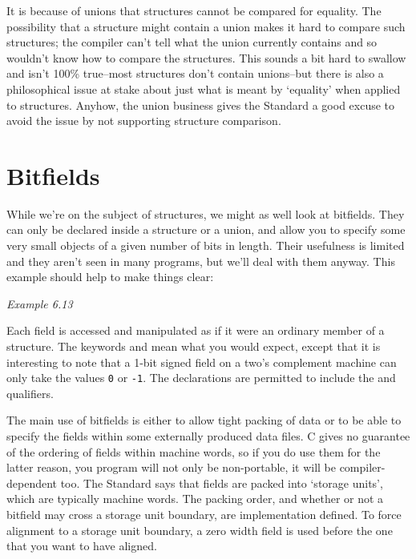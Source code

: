  It is because of unions that structures cannot be compared for equality.
   The possibility that a structure might contain a union makes it hard to
   compare such structures; the compiler can't tell what the union currently
   contains and so wouldn't know how to compare the structures. This sounds
   a bit hard to swallow and isn't 100\% true--most structures don't contain
   unions--but there is also a philosophical issue at stake about just what
   is meant by `equality' when applied to structures. Anyhow, the union
   business gives the Standard a good excuse to avoid the issue by not
   supporting structure comparison.


 
        \section{Bitfields}\label{sec:bitfields}
        

  

  While we're on the subject of structures, we might as well look at
   bitfields. They can only be declared inside a structure or a union, and
   allow you to specify some very small objects of a given number of bits in
   length.  Their usefulness is limited and they aren't seen in many programs,
   but we'll deal with them anyway. This example should help to make things
   clear:


   \begin{center}\textit{Example 6.13}\end{center}


  Each field is accessed and manipulated as if it were an ordinary member of
   a structure. The keywords \signed{} and \unsigned{} mean
   what you would expect, except that it is interesting to note that a 1-bit
   signed field on a two's complement machine can only take the values
   \texttt{0} or \texttt{-1}. The declarations are permitted to include
   the \const{} and \volatile{} qualifiers.


  The main use of bitfields is either to allow tight packing of data or to
   be able to specify the fields within some externally produced data files.
   C gives no guarantee of the ordering of fields within machine words, so if
   you do use them for the latter reason, you program will not only be
   non-portable, it will be compiler-dependent too. The Standard says that
   fields are packed into `storage units', which are typically machine
   words. The packing order, and whether or not a bitfield may cross a storage
   unit boundary, are implementation defined. To force alignment to a storage
   unit boundary, a zero width field is used before the one that you want to
   have aligned.


